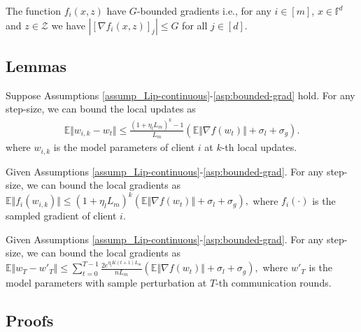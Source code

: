 \begin{assumption}
    The function $f_i(x,z)$ have $G$-bounded gradients i.e., for any $i \in [m]$, $x \in \mathbb{f}^d$ and $z \in \mathcal{Z}$ we have $|[\nabla f_i(x,z)]_j| \leq G $ for all $j \in [d]$.
    \label{asp:bounded-grad}
\end{assumption}

\subsection{Lemmas}

\begin{lemma}\label{lem:bound-local-updates}
    Suppose Assumptions \ref{assump_Lip-continuous}-\ref{asp:bounded-grad} hold. For any step-size, we
    can bound the local updates as
    \begin{align}
        \mathbb{E}\Vert w_{i,k} - w_t \Vert
        \le \frac{(1 + \eta_l L_m)^k-1}{L_m} \left( \mathbb{E}\Vert \nabla f(w_t) \Vert +\sigma_{l} + \sigma_{g} \right). \nonumber
    \end{align}
    where $w_{i,k}$ is the model parameters of client $i$ at $k$-th local updates.
\end{lemma}

\begin{lemma}   \label{lem:bound-local-gradients}
    Given Assumptions \ref{assump_Lip-continuous}-\ref{asp:bounded-grad}. For any step-size, we
    can bound the local gradients as
    $
        \mathbb{E}\Vert f_i(w_{i,k}) \Vert \le (1 + \eta_l L_m)^k\left( \mathbb{E}\Vert \nabla f(w_t) \Vert +\sigma_{l} + \sigma_{g} \right),
    $
    where $f_i(\cdot)$ is the sampled gradient of client $i$.
\end{lemma}

\begin{lemma}   \label{lem:bound-global-updates}
    Given Assumptions \ref{assump_Lip-continuous}-\ref{asp:bounded-grad}. For any step-size, we
    can bound the local gradients as
    $
    \mathbb{E}\Vert w_T - w'_T \Vert \le \sum_{t=0}^{T-1} \frac{2e^{\eta_lK(t+1) L_m}}{n L_m}\left( \mathbb{E}\Vert \nabla f(w_t) \Vert +\sigma_{l} + \sigma_{g} \right),
    $
    where $w'_T$ is the model parameters with sample perturbation at $T$-th communication rounds.
\end{lemma}

\subsection{Proofs}
